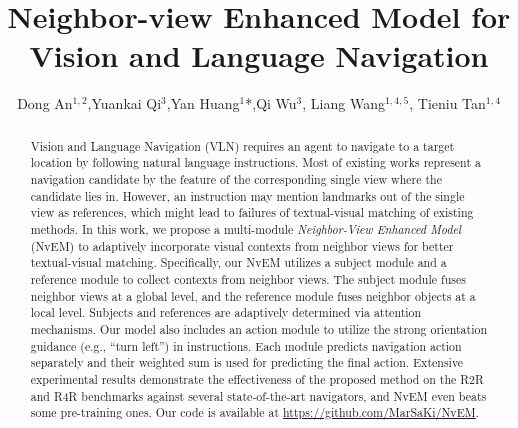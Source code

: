 \documentclass[sigconf]{acmart}
\begin{document}
\fancyhead{}

\title{Neighbor-view Enhanced Model for Vision and Language Navigation}



\author{Dong An$^{1,2}$,\quad Yuankai Qi$^3$,\quad Yan Huang$^{1}$*,\quad Qi Wu$^{3}$, \quad Liang Wang$^{1,4,5}$, \quad Tieniu Tan$^{1,4}$}


\makeatletter
\def\authornotetext#1{
	\if@ACM@anonymous\else
	\g@addto@macro\@authornotes{
		\stepcounter{footnote}\footnotetext{#1}}
	\fi}
\makeatother
\authornotetext{Corresponding author.}




\def\authors{Dong An, Yuankai Qi, Yan Huang, Qi Wu, Liang Wang, Tieniu Tan}


\renewcommand{\shortauthors}{An and Qi et al.}



\begin{abstract}
 	Vision and Language Navigation (VLN) requires an agent to navigate to a target location by following natural language instructions. Most of existing works represent a navigation candidate by the feature of the corresponding single view where the candidate lies in. However, an instruction may mention landmarks out of the single view as references, which might lead to failures of textual-visual matching of existing methods. In this work, we propose a multi-module \textit{Neighbor-View Enhanced Model} (NvEM) to adaptively incorporate visual contexts from neighbor views for better textual-visual matching. Specifically, our NvEM utilizes a subject module and a reference module to collect contexts from neighbor views. The subject module fuses neighbor views at a global level, and the reference module fuses neighbor objects at a local level. Subjects and references are adaptively determined via attention mechanisms. Our model also includes an action module to utilize the strong orientation guidance (e.g., ``turn left'') in instructions. Each module predicts navigation action separately and their weighted sum is used for predicting the final action. Extensive experimental results demonstrate the effectiveness of the proposed method on the R2R and R4R benchmarks against several state-of-the-art navigators, and NvEM even beats some pre-training ones. Our code is available at \url{https://github.com/MarSaKi/NvEM}.
\end{abstract}
\end{document}
